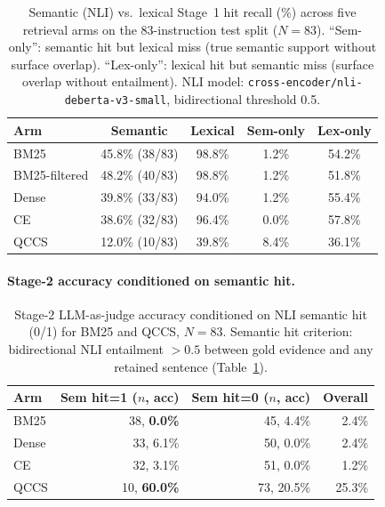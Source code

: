 \documentclass{article}
\begin{document}
\begin{table}[H]
\centering
\caption{Semantic (NLI) vs.\ lexical Stage~1 hit recall (\%) across five
  retrieval arms on the 83-instruction test split ($N{=}83$). ``Sem-only'': semantic
  hit but lexical miss (true semantic support without surface overlap).
  ``Lex-only'': lexical hit but semantic miss (surface overlap without entailment).
  NLI model: \texttt{cross-encoder/nli-deberta-v3-small}, bidirectional threshold 0.5.}
\label{tab:nli}
\small
\begin{tabular}{@{}lcccc@{}}
\toprule
Arm & Semantic & Lexical & Sem-only & Lex-only \\
\midrule
BM25          & 45.8\% (38/83) & 98.8\% & 1.2\% & 54.2\% \\
BM25-filtered & 48.2\% (40/83) & 98.8\% & 1.2\% & 51.8\% \\
Dense         & 39.8\% (33/83) & 94.0\% & 1.2\% & 55.4\% \\
CE            & 38.6\% (32/83) & 96.4\% & 0.0\% & 57.8\% \\
QCCS          & 12.0\% (10/83) & 39.8\%  & 8.4\% & 36.1\% \\
\bottomrule
\end{tabular}
\end{table}

\paragraph{Stage-2 accuracy conditioned on semantic hit.}

\begin{table}[H]
\centering
\caption{Stage-2 LLM-as-judge accuracy conditioned on NLI semantic hit (0/1)
  for BM25 and QCCS, $N{=}83$. Semantic hit criterion: bidirectional NLI entailment
  $>0.5$ between gold evidence and any retained sentence
  (Table~\ref{tab:nli}).}
\label{tab:sem_condacc}
\small
\begin{tabular}{@{}lrrr@{}}
\toprule
Arm & Sem hit=1 ($n$, acc) & Sem hit=0 ($n$, acc) & Overall \\
\midrule
BM25  & 38, \textbf{0.0\%} & 45, 4.4\% & 2.4\% \\
Dense & 33, 6.1\% & 50, 0.0\% & 2.4\% \\
CE    & 32, 3.1\% & 51, 0.0\% & 1.2\% \\
QCCS  & 10, \textbf{60.0\%} & 73, 20.5\% & 25.3\% \\
\bottomrule
\end{tabular}
\end{table}
\end{document}
